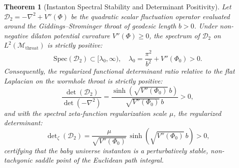 \documentclass[11pt,a4paper,reqno]{article}
\theoremstyle{plain}
\newtheorem{theorem}{Theorem}[section]
\theoremstyle{definition}
\theoremstyle{remark}
\numberwithin{equation}{section}
\begin{document}
\begin{theorem}[Instanton Spectral Stability and Determinant Positivity]
\label{thm:instanton_stability}
Let $\mathcal{D}_2 = -\nabla^2 + V''(\Phi)$ be the quadratic scalar fluctuation operator evaluated around the Giddings--Strominger throat of geodesic length $b > 0$. Under non-negative dilaton potential curvature $V''(\Phi) \ge 0$, the spectrum of $\mathcal{D}_2$ on $L^2(\mathcal{M}_{\mathrm{throat}})$ is strictly positive:
\begin{equation}
  \mathrm{Spec}(\mathcal{D}_2) \subset [\lambda_0, \infty), \quad \lambda_0 = \frac{\pi^2}{b^2} + V''(\Phi_0) > 0.
\end{equation}
Consequently, the regularized functional determinant ratio relative to the flat Laplacian on the wormhole throat is strictly positive:
\begin{equation}
  \frac{\det(\mathcal{D}_2)}{\det(-\nabla^2)} = \frac{\sinh\left( \sqrt{V''(\Phi_0)} \, b \right)}{\sqrt{V''(\Phi_0)} \, b} > 0,
\end{equation}
and with the spectral zeta-function regularization scale $\mu$, the regularized determinant:
\begin{equation}
  \det\nolimits_{\zeta}(\mathcal{D}_2) = \frac{\mu}{\sqrt{V''(\Phi_0)}} \, \sinh\left( \sqrt{V''(\Phi_0)} \, b \right) > 0,
\end{equation}
certifying that the baby universe instanton is a perturbatively stable, non-tachyonic saddle point of the Euclidean path integral.
\end{theorem}
\end{document}
